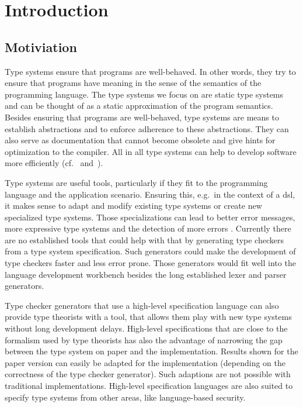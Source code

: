 \chapter{Introduction}
\section{Motiviation}
Type systems ensure that programs are well-behaved. In other words,
they try to ensure that programs have meaning in the sense of the
semantics of the programming language. The type systems we focus on
are static type systems and can be thought of as a static
approximation of the program semantics. Besides ensuring that programs
are well-behaved, type systems are means to establish abstractions and
to enforce adherence to these abstractions. They can also serve as
documentation that cannot become obsolete and give hints for
optimization to the compiler. All in all type systems can help to
develop software more efficiently
(cf.~\cite{Petersen:2014:ECS:2597008.2597152}
and~\cite{Mayer:2012:ESI:2384616.2384666}).

Type systems are useful tools, particularly if they fit to the
programming language and the application scenario. Ensuring this,
e.g.\ in the context of a \gls{dsl}, it makes sense to adapt and
modify existing type systems or create new specialized type
systems. Those specializations can lead to better error messages, more
expressive type systems and the detection of more errors
\cite{Thiemann02programmabletype}. Currently there are no established
tools that could help with that by generating type checkers from a
type system specification. Such generators could make the development
of type checkers faster and less error prone. Those generators would
fit well into the language development workbench besides the long
established lexer and parser generators.

Type checker generators that use a high-level specification language
can also provide type theorists with a tool, that allows them play
with new type systems without long development delays. High-level
specifications that are close to the formalism used by type theorists
has also the advantage of narrowing the gap between the type system on
paper and the implementation. Results shown for the paper version can
easily be adapted for the implementation (depending on the correctness
of the type checker generator). Such adaptions are not possible with
traditional implementations. High-level specification languages are
also suited to specify type systems from other areas, like
language-based security.

